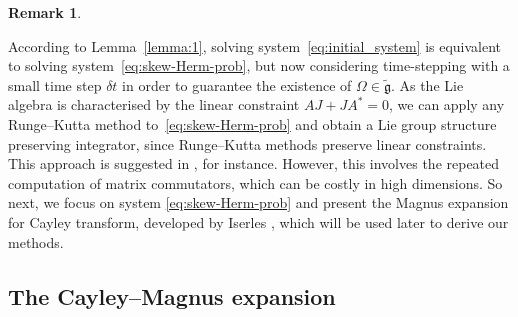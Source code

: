 \documentclass{article}
\newtheorem{remark}{Remark}
\def\boris{\textcolor{red}}
\newcommand{\Om}{\Omega}
\begin{document}
{\begin{remark}
\end{remark}
According to Lemma~\ref{lemma:1}, solving system~\eqref{eq:initial_system} is equivalent to solving system~\eqref{eq:skew-Herm-prob}, but now considering time-stepping with a small time step $\delta t$ in order to guarantee the existence of $\Om \in \tilde{\mathfrak g}$.
As the Lie algebra is characterised by the linear constraint $AJ+JA^\ast =0$, we can apply any Runge--Kutta method to~\eqref{eq:skew-Herm-prob} and obtain a Lie group structure preserving integrator, since Runge--Kutta methods preserve linear constraints. This approach is suggested in \cite[IV.8.3]{HLW:2006}, for instance. However, this involves the repeated computation of matrix commutators, which can be costly in high dimensions. 
So next, we focus on system \eqref{eq:skew-Herm-prob} and present the Magnus expansion for Cayley transform, developed by Iserles \cite{Iserles:2001}, which will be used later to derive our methods.

\subsection{The Cayley--Magnus expansion}

}
\end{document}
